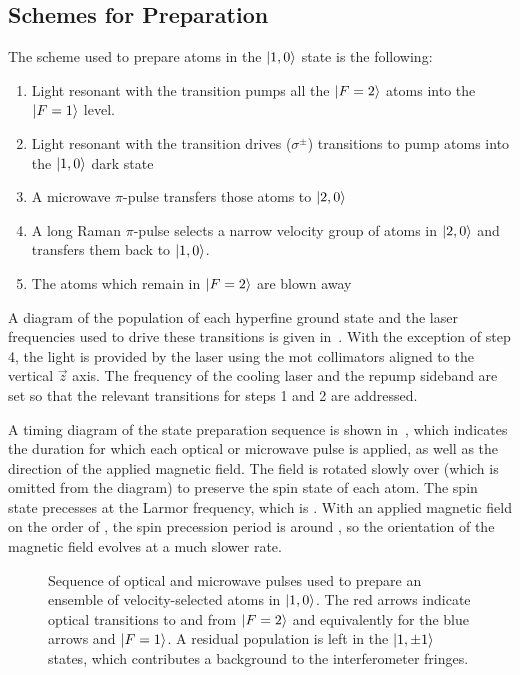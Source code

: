 \subsection{Schemes for Preparation}\label{subsec:prep_schemes}
The scheme used to prepare atoms in the \(\ket{1,0}\) state is the
following:
\begin{enumerate}
    \item Light resonant with the  transition pumps all
      the $\ket{F=2}$ atoms
      into the \(\ket{F=1}\) level.
    \item Light resonant with the  transition drives (\(\sigma^{\pm}\)) transitions to pump atoms into the \(\ket{1,0}\) dark state
    \item A microwave $\pi$-pulse transfers those atoms to \(\ket{2,0}\)
    \item A long Raman $\pi$-pulse selects a narrow velocity group of
      atoms in $\ket{2,0}$ and transfers them back to $\ket{1,0}$.
    \item The atoms which remain in \(\ket{F=2}\) are blown away
\end{enumerate}
A diagram of the population of each hyperfine ground state and the
laser frequencies used to drive these transitions is given
in~. With the exception of step 4, the light
is provided by the \Muquans laser using the \ac{mot} collimators
aligned to the vertical \(\vec{z}\) axis. The frequency of the cooling
laser and the repump sideband are set so that the relevant transitions
for steps 1 and 2 are addressed. 
\par\noindent
A timing diagram of the state preparation sequence is shown
in~, which indicates the
duration for which each optical or microwave pulse is applied, as well
as the direction of the applied magnetic field. The field is rotated
slowly over  (which is omitted from the
diagram) to preserve the spin state of each atom. The spin state
precesses at the Larmor frequency, which is
.
With an applied magnetic field on the order of , the
spin precession period is around , so the
orientation of the magnetic field evolves at a much slower rate.
\begin{figure}[!htbp]
    \centering
    \fontsize{32pt}{32pt}
    \resizebox{0.8\textwidth}{!}{}
    \caption[State preparation pulse sequence]{Sequence of optical and
    microwave pulses used to prepare an ensemble of velocity-selected
  atoms in \(\ket{1,0}\). The red arrows indicate optical transitions
to and from \(\ket{F=2}\) and equivalently for the blue arrows and
\(\ket{F=1}\). A residual population is left in the \(\ket{1,\pm 1}\)
states, which contributes a background to the interferometer fringes.}
    \label{fig:state_prep}
\end{figure}
